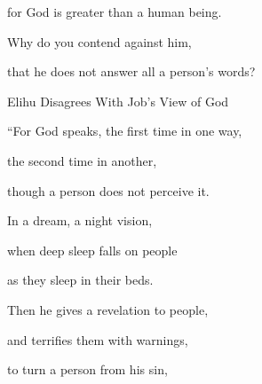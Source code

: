 {\par }{\Q for
God
is greater than
a human being.
\par }{\Q {}Why
do you contend
against him,
\par }{\Q that
he does not
answer
all
a person’s words?
\par }{\SH Elihu Disagrees With Job’s View of God
\par }{\Q {}“For
God
speaks,
the first
time in one way,
\par }{\Q the second
time in another,
\par }{\Q though a person does not
perceive it.
\par }{\Q {}In a dream,
a night
vision,
\par }{\Q when deep sleep
falls
on
people
\par }{\Q as they sleep
in
their beds.
\par }{\Q {}Then
he gives a revelation
to people,
\par }{\Q and terrifies them with warnings,
\par }{\Q {}to turn
a person
from his sin,

}
